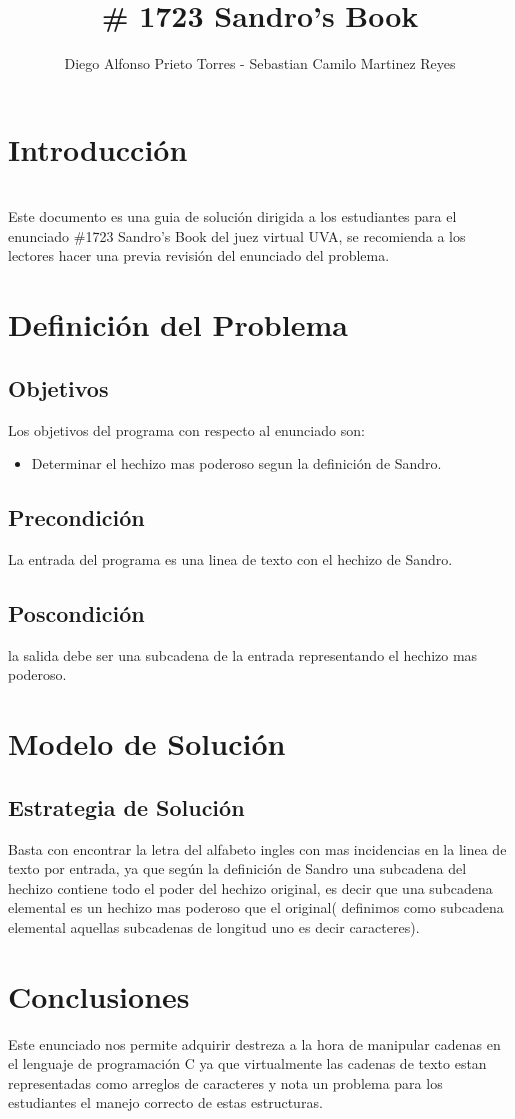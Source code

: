 \documentclass[12pt]{article}
\begin{document}
\title{ \# 1723  Sandro's Book }
\author{Diego Alfonso Prieto Torres - Sebastian Camilo Martinez Reyes}
\maketitle
\tableofcontents
\section{Introducci\'on}
\\Este documento es una guia de soluci\' on dirigida a los estudiantes para el enunciado \#1723 Sandro's Book del juez virtual UVA, se recomienda a los lectores hacer una previa revisi\'on del enunciado del problema.
\section{Definici\'on del Problema}
\subsection{Objetivos}
Los objetivos del programa con respecto al enunciado son:
\begin{itemize}
\item Determinar el hechizo mas poderoso segun la definici\'on de Sandro.
\end{itemize}
\subsection{Precondici\'on}
La entrada del programa es una linea de texto con el hechizo de Sandro.
\subsection{Poscondici\'on}
la salida debe ser una subcadena de la entrada representando el hechizo mas poderoso.
\section{Modelo de Soluci\'on}
\subsection{Estrategia de Soluci\'on}
Basta con encontrar la letra del alfabeto ingles con mas incidencias en la linea de texto por entrada, ya que seg\'un la definici\'on de 
Sandro una subcadena del hechizo contiene todo el poder del hechizo original, es decir que una subcadena elemental es 
un hechizo mas poderoso que el original( definimos como subcadena elemental aquellas subcadenas de longitud uno es decir caracteres). 
\section{Conclusiones}
Este enunciado nos permite adquirir destreza a la hora de manipular cadenas en el lenguaje de programaci\'on C ya que virtualmente las cadenas de texto estan representadas como arreglos de caracteres y nota un problema para los estudiantes el manejo correcto de estas estructuras.
\end{document}
